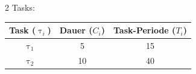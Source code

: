 \begin{frame}
	2 Tasks:
	\begin{center}
		\begin{tabular}{c||c|c}
				Task ($\uptau_i$) & Dauer ($C_i$) & Task-Periode ($T_i$)\\\hline\hline
				$\uptau_1$ & 5 & 15\\
				$\uptau_2$ & 10 & 40\\
		\end{tabular}
	\end{center}
\end{frame}

\begin{frame}
	
\end{frame}

\begin{frame}
	
\end{frame}
